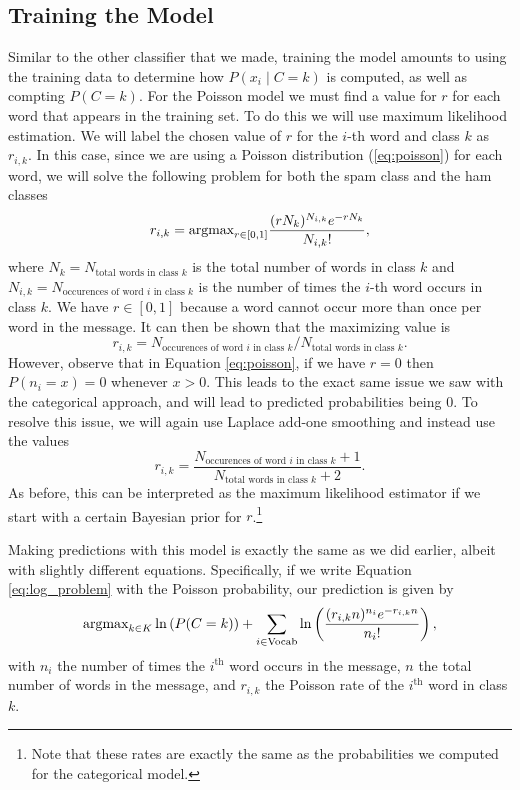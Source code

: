 \subsection*{Training the Model}
Similar to the other classifier that we made, training the model amounts to using the training data to determine how $P(x_i \mid C=k)$ is computed, as well as compting $P(C=k)$.
For the Poisson model we must find a value for $r$ for each word that appears in the training set.
To do this we will use maximum likelihood estimation.
We will label the chosen value of $r$ for the $i$-th word and class $k$ as $r_{i,k}$.
In this case, since we are using a Poisson distribution (\ref{eq:poisson}) for each word, we will solve the following problem for both the spam class and the ham classes
\begin{equation}\label{eq:MLE}
    r_{i,k} = \mbox{argmax}_{r\in[0,1]}\frac{(rN_k)^{N_{i,k}}e^{-rN_k}}{N_{i,k}!},
\end{equation}
where $N_k=N_\text{total words in class $k$}$ is the total number of words in class $k$ and $N_{i,k}=N_\text{occurences of word $i$ in class $k$}$ is the number of times the $i$-th word occurs in class $k$.
We have $r\in[0,1]$ because a word cannot occur more than once per word in the message.
It can then be shown that the maximizing value is
\[
r_{i,k} = N_\text{occurences of word $i$ in class $k$}
 / N_\text{total words in class $k$}.
\]
However, observe that in Equation \eqref{eq:poisson}, if we have $r=0$ then $P(n_i=x)=0$ whenever $x>0$.
This leads to the exact same issue we saw with the categorical approach, and will lead to predicted probabilities being 0.
To resolve this issue, we will again use Laplace add-one smoothing and instead use the values
\begin{equation}\label{eq:normalized_r}
    r_{i,k} = \frac{N_\text{occurences of word $i$ in class $k$}+1}
{N_\text{total words in class $k$}+2}.
\end{equation}
As before, this can be interpreted as the maximum likelihood estimator if we start with a certain Bayesian prior for $r$.\footnote{Note that these rates are exactly the same as the probabilities we computed for the categorical model.}

Making predictions with this model is exactly the same as we did earlier, albeit with slightly different equations.
Specifically, if we write Equation \ref{eq:log_problem} with the Poisson probability, our prediction is given by
\begin{equation}\label{eq:poisson_prob}
\mbox{argmax}_{k\in K}\ln\left(P(C=k)\right) +
\sum_{i\in\text{Vocab}}
\ln\left(\frac{(r_{i,k}n)^{n_i}e^{-r_{i,k}n}}{n_i!}\right),
\end{equation}
with $n_i$ the number of times the $i^{\text{th}}$ word occurs in the message, $n$ the total number of words in the message, and $r_{i,k}$ the Poisson rate of the $i^{\text{th}}$ word in class $k$.

